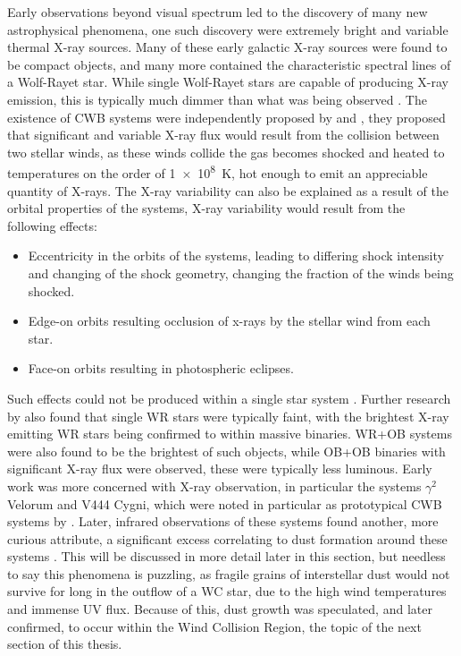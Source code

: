 Early observations beyond visual spectrum led to the discovery of many new astrophysical phenomena, one such discovery were extremely bright and variable thermal X-ray sources.
Many of these early galactic X-ray sources were found to be compact objects, and many more contained the characteristic spectral lines of a Wolf-Rayet star.
While single Wolf-Rayet stars are capable of producing X-ray emission, this is typically much dimmer than what was being observed 
\parencite{sewardXraysEtaCarinae1979}.
The existence of CWB systems were independently proposed by \textcite{prilutskii_x_1976} and \textcite{cherepashchukDetectabilityWolfRayetBinaries1976}, 
they proposed that significant and variable X-ray flux would result from the collision between two stellar winds, as these winds collide the gas becomes shocked and heated to temperatures on the order of \SI{1e8}{\kelvin}, hot enough to emit an appreciable quantity of X-rays.
The X-ray variability can also be explained as a result of the orbital properties of the systems, X-ray variability would result from the following effects:

\begin{itemize}
  \item Eccentricity in the orbits of the systems, leading to differing shock intensity and changing of the shock geometry, changing the fraction of the winds being shocked.
  \item Edge-on orbits resulting occlusion of x-rays by the stellar wind from each star. 
  \item Face-on orbits resulting in photospheric eclipses.
\end{itemize}

\noindent
Such effects could not be produced within a single star system \parencite{pittard_x-ray_1999}.
Further research by \textcite{pollockEinsteinViewWolfRayet1987} also found that single WR stars were typically faint, with the brightest X-ray emitting WR stars being confirmed to within massive binaries.
WR+OB systems were also found to be the brightest of such objects, while OB+OB binaries with significant X-ray flux were observed, these were typically less luminous.
Early work was more concerned with X-ray observation, in particular the systems $\gamma^2$ Velorum and V444 Cygni, which were noted in particular as prototypical CWB systems by \textcite{prilutskii_x_1976}.
Later, infrared observations of these systems found another, more curious attribute, a significant excess correlating to dust formation around these systems \parencite{williamsInfraredPhotometryLatetype1987}.
This will be discussed in more detail later in this section, but needless to say this phenomena is puzzling, as fragile grains of interstellar dust would not survive for long in the outflow of a WC star, due to the high wind temperatures and immense UV flux.
Because of this, dust growth was speculated, and later confirmed, to occur within the Wind Collision Region, the topic of the next section of this thesis.

